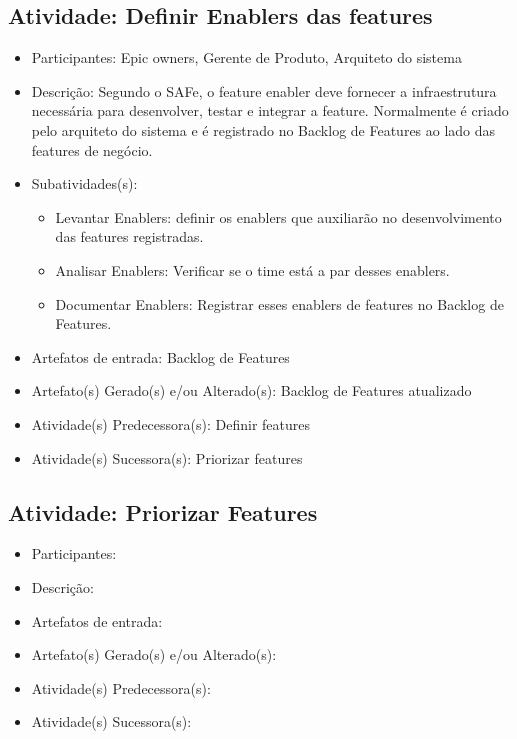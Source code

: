 \subsection{Atividade: Definir Enablers das features}
\begin{itemize}
\item Participantes: Epic owners, Gerente de Produto, Arquiteto do sistema

\item Descrição: Segundo o SAFe, o feature enabler deve fornecer a infraestrutura necessária para desenvolver, testar e integrar a feature. Normalmente é criado pelo arquiteto do sistema e é registrado no Backlog de Features ao lado das features de negócio.

\item Subatividades(s):
    \begin{itemize} 
    \item Levantar Enablers: definir os enablers que auxiliarão no desenvolvimento das features registradas.
    \item Analisar Enablers: Verificar se o time está a par desses enablers.
    \item Documentar Enablers:  Registrar esses enablers de features no Backlog de Features.
    \end{itemize}


\item Artefatos de entrada: Backlog de Features

\item Artefato(s) Gerado(s) e/ou Alterado(s): Backlog de Features atualizado

\item Atividade(s) Predecessora(s): Definir features
  
\item Atividade(s) Sucessora(s): Priorizar features
\end{itemize}


\subsection{Atividade: Priorizar Features}
\begin{itemize}
\item Participantes: 

\item Descrição: 

\item Artefatos de entrada: 

\item Artefato(s) Gerado(s) e/ou Alterado(s): 

\item Atividade(s) Predecessora(s): 
  
\item Atividade(s) Sucessora(s): 
\end{itemize}


